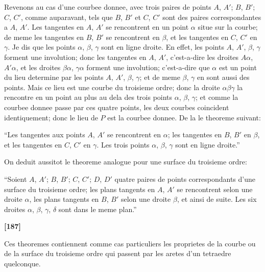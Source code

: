 \documentclass[11pt,a4paper]{book}
\begin{document}
Revenons au cas d'une courbee donnee, avec trois paires de points $A$, $A'$; $B$, $B'$; $C$, $C'$,
comme auparavant, tels que $B$, $B'$ et $C$, $C'$ sont des paires correspondantes a $A$, $A'$. Les
tangentes en $A$, $A'$ se rencontrent en un point $\alpha$ situe sur la courbe; de meme les
tangentes en $B$, $B'$ se rencontrent en $\beta$, et les tangentes en $C$, $C'$ en $\gamma$. Je dis que les
points $\alpha$, $\beta$, $\gamma$ sont en ligne droite. En effet, les points $A$, $A'$, $\beta$, $\gamma$ forment une involution;
donc les tangentes en $A$, $A'$, c'est-a-dire les droites $A\alpha$, $A'\alpha$, et les droites $\beta\alpha$, $\gamma\alpha$
forment une involution; c'est-a-dire que $\alpha$ est un point du lieu determine par les points
$A$, $A'$, $\beta$, $\gamma$; et de meme $\beta$, $\gamma$ en sont aussi des points. Mais ce lieu est une courbe du
troisieme ordre; donc la droite $\alpha\beta\gamma$ la rencontre en un point au plus au dela des trois
points $\alpha$, $\beta$, $\gamma$; et comme la courbee donnee passe par ces quatre points, les deux courbes
coincident identiquement; donc le lieu de $P$ est la courbee donnee. De la le theoreme
suivant:

``Les tangentes aux points $A$, $A'$ se rencontrent en $\alpha$; les tangentes en $B$, $B'$ en $\beta$,
et les tangentes en $C$, $C'$ en $\gamma$. Les trois points $\alpha$, $\beta$, $\gamma$ sont en ligne droite.''

On deduit aussitot le theoreme analogue pour une surface du troisieme ordre:

``Soient $A$, $A'$; $B$, $B'$; $C$, $C'$; $D$, $D'$ quatre paires de points correspondants d'une
surface du troisieme ordre; les plans tangents en $A$, $A'$ se rencontrent selon une droite
$\alpha$, les plans tangents en $B$, $B'$ selon une droite $\beta$, et ainsi de suite. Les six droites
$\alpha$, $\beta$, $\gamma$, $\delta$ sont dans le meme plan.''

\textbf{[187]}

Ces theoremes contiennent comme cas particuliers les proprietes de la courbe ou de
la surface du troisieme ordre qui passent par les aretes d'un tetraedre quelconque.
\end{document}
